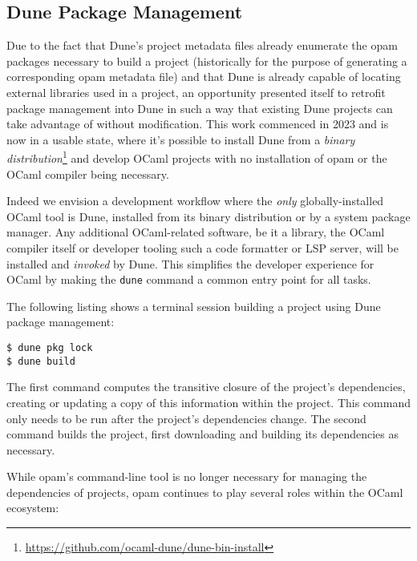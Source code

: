 \documentclass{article}
\begin{document}
\begin{multicols}{2}
        \section {Dune Package Management}

        Due to the fact that Dune's project metadata files already enumerate
        the opam packages necessary to build a project (historically for the
        purpose of generating a corresponding opam metadata file) and that Dune
        is already capable of locating external libraries used in a project, an
        opportunity presented itself to retrofit package management into Dune in
        such a way that existing Dune projects can take advantage of without
        modification. This work commenced in 2023 and is now in a usable state,
        where it's possible to install Dune from a \textit{binary
        distribution}\footnote{\url{https://github.com/ocaml-dune/dune-bin-install}} and develop OCaml
        projects with no installation of opam or the OCaml compiler being
        necessary.

        Indeed we envision a development workflow where the \textit{only}
        globally-installed OCaml tool is Dune, installed from its binary
        distribution or by a system package manager. Any additional
        OCaml-related software, be it a library, the OCaml compiler itself or
        developer tooling such a code formatter or LSP server, will be installed
        and \textit{invoked} by Dune. This simplifies the developer experience
        for OCaml by making the \texttt{dune} command a common entry point for all
        tasks.

        The following listing shows a terminal session building a project using
        Dune package management:
        \begin{lstlisting}
$ dune pkg lock
$ dune build
        \end{lstlisting}

        The first command computes the transitive closure of the project's
        dependencies, creating or updating a copy of this information within the
        project. This command only needs to be run after the project's
        dependencies change. The second command builds the project, first
        downloading and building its dependencies as necessary.

        While opam's command-line tool is no longer necessary for managing the
        dependencies of projects, opam continues to play several roles within
        the OCaml ecosystem:


\end{multicols}
\end{document}
